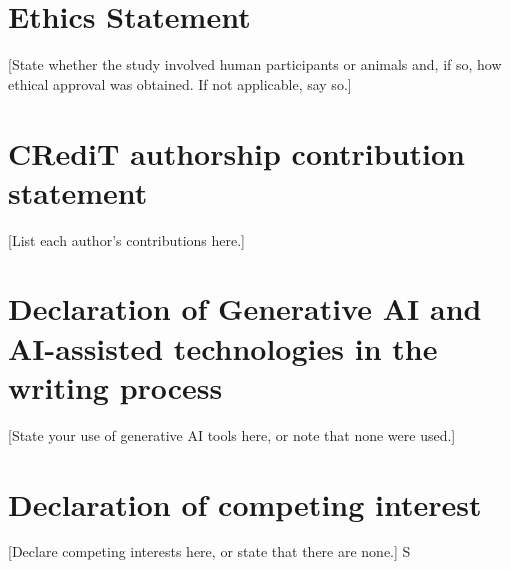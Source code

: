 \section*{Ethics Statement}
[State whether the study involved human participants or animals and,
if so, how ethical approval was obtained. If not applicable, say so.]

\section*{CRediT authorship contribution statement}

[List each author's contributions here.]

\section*{Declaration of Generative AI and AI-assisted technologies in the writing process}

[State your use of generative AI tools here, or note that none were used.]

\section*{Declaration of competing interest}

[Declare competing interests here, or state that there are none.]
S